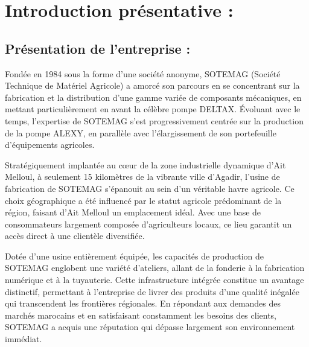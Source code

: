\documentclass[a4paper, 11pt, openany]{report}
\begin{document}
\newpage %

\chapter{Introduction présentative :}
\section{Présentation de l'entreprise :}
Fondée en 1984 sous la forme d'une société anonyme, SOTEMAG (Société Technique de Matériel Agricole) a amorcé son parcours en se concentrant sur la fabrication et la distribution d'une gamme variée de composants mécaniques, en mettant particulièrement en avant la célèbre pompe DELTAX. Évoluant avec le temps, l'expertise de SOTEMAG s'est progressivement centrée sur la production de la pompe ALEXY, en parallèle avec l'élargissement de son portefeuille d'équipements agricoles.

Stratégiquement implantée au cœur de la zone industrielle dynamique d'Ait Melloul, à seulement 15 kilomètres de la vibrante ville d'Agadir, l'usine de fabrication de SOTEMAG s'épanouit au sein d'un véritable havre agricole. Ce choix géographique a été influencé par le statut agricole prédominant de la région, faisant d'Ait Melloul un emplacement idéal. Avec une base de consommateurs largement composée d'agriculteurs locaux, ce lieu garantit un accès direct à une clientèle diversifiée.

Dotée d'une usine entièrement équipée, les capacités de production de SOTEMAG englobent une variété d'ateliers, allant de la fonderie à la fabrication numérique et à la tuyauterie. Cette infrastructure intégrée constitue un avantage distinctif, permettant à l'entreprise de livrer des produits d'une qualité inégalée qui transcendent les frontières régionales. En répondant aux demandes des marchés marocains et en satisfaisant constamment les besoins des clients, SOTEMAG a acquis une réputation qui dépasse largement son environnement immédiat.
\end{document}
